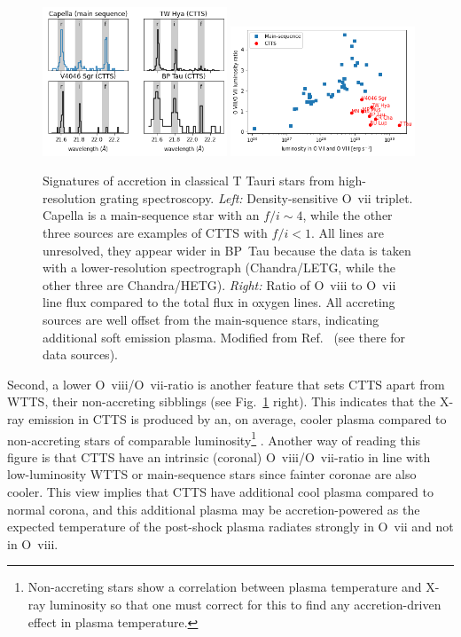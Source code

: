 \begin{figure}[t]
\centering
\includegraphics[width=0.49\textwidth]{figs/o7f2i.png}
\includegraphics[width=0.49\textwidth]{figs/o72o8.png}
\caption{Signatures of accretion in classical T Tauri stars from high-resolution grating spectroscopy. \emph{Left:} Density-sensitive O~{\sc vii} triplet. Capella is a main-sequence star with an $f/i\sim 4$, while the other three sources are examples of CTTS with $f/i < 1$. All lines are unresolved, they appear wider in BP~Tau because the data is taken with a lower-resolution spectrograph (Chandra/LETG, while the other three are Chandra/HETG). \emph{Right:} Ratio of O~{\sc viii} to O~{\sc vii} line flux compared to the total flux in oxygen lines. All accreting sources are well offset from the main-squence stars, indicating additional soft emission plasma. Modified from Ref.~ \cite{2013ApJ...771...70G} (see there for data sources). \label{fig:softexcess}}
\end{figure}


Second, a lower O~{\sc viii}/O~{\sc vii}-ratio is another feature that sets CTTS  apart from WTTS, their non-accreting sibblings (see Fig.~\ref{fig:softexcess} right). This indicates that the X-ray emission in CTTS is produced by an, on average, cooler plasma compared to non-accreting stars of comparable luminosity\footnote{Non-accreting stars show a correlation between plasma temperature and X-ray luminosity so that one must correct for this to find any accretion-driven effect in plasma temperature.} \cite{2007A&A...473..229R,2007A&A...474L..25G}. Another way of reading this figure is that 
CTTS have an intrinsic (coronal) O~{\sc viii}/O~{\sc vii}-ratio in line with low-luminosity WTTS or main-sequence stars since fainter coronae are also cooler. This view implies that CTTS have additional cool plasma compared to normal corona, and this additional plasma may be accretion-powered as the expected temperature of the post-shock plasma radiates strongly in O~{\sc vii} and not in O~{\sc viii}.

